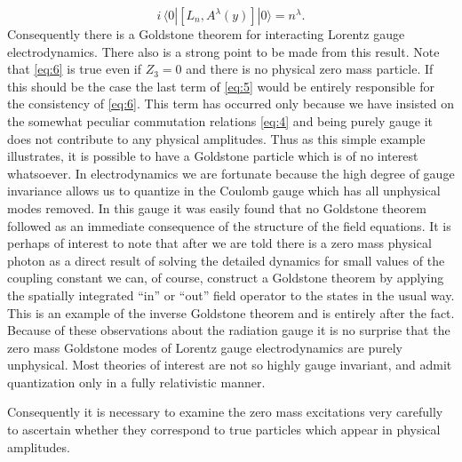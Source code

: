 \documentclass[%
  12pt,
  paper=letter,
  abstracton,
  pagesize=auto,
  version=last,
  DIV=calc
  ]{article}
\begin{document}
\begin{equation}
\label{eq:6}
i\, \langle 0|[L_n, A^\lambda(y)]|0\rangle = n^{\lambda}.
\end{equation}
Consequently there is a Goldstone theorem for interacting Lorentz
gauge electrodynamics.  There also is a strong point to be made from
this result. Note that \eqref{eq:6} is true even if $Z_3=0$ and there is no
physical zero mass particle.  If this should be the case the last term
of \eqref{eq:5} would be entirely responsible for the consistency of \eqref{eq:6}.
This term has occurred only because we have insisted on the somewhat
peculiar commutation relations \eqref{eq:4} and being purely gauge it does not
contribute to any physical amplitudes.  Thus as this simple example
illustrates, it is possible to have a Goldstone particle which is of
no interest whatsoever.  In electrodynamics we are fortunate because
the high degree of gauge invariance allows us to quantize in the
Coulomb gauge which has all unphysical modes removed.  In this gauge
it was easily found that no Goldstone theorem followed as an immediate
consequence of the structure of the field equations.  It is perhaps of
interest to note that after we are told there is a zero mass physical
photon as a direct result of solving the detailed dynamics for small
values of the coupling constant we can, of course, construct a
Goldstone theorem by applying the spatially integrated ``in'' or ``out''
field operator to the states in the usual way.  This is an example of
the inverse Goldstone theorem and is entirely after the fact.  Because
of these observations about the radiation gauge it is no surprise that
the zero mass Goldstone modes of Lorentz gauge electrodynamics are
purely unphysical.  Most theories of interest are not so highly gauge
invariant, and admit quantization only in a fully relativistic
manner.

Consequently it is necessary to examine the zero mass excitations very
carefully to ascertain whether they correspond to true particles which
appear in physical amplitudes.
\end{document}
